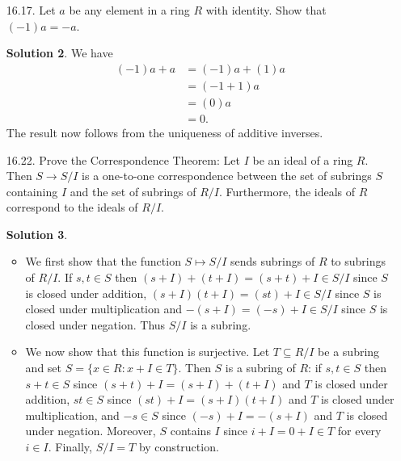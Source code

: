 \documentclass{article}
\theoremstyle{definition}
\newtheorem*{solution}{Solution}
\begin{document}
\begin{enumerate}
\begin{solution}
\begin{align*}
&= \begin{pmatrix} ac - bd & ad + bc \\ -ad - bc & ac - bd \end{pmatrix}
\end{align*}
Finally, we show that $\phi$ is injective and thus an isomorphism onto its image.  If $\phi(a + bi) = \begin{psmallmatrix} 0 & 0 \\ 0 & 0 \end{psmallmatrix}$ then $a = 0$ and $b = 0$.
\end{solution}
\item[16.17.] Let $a$ be any element in a ring $R$ with identity.  Show that $(-1)a = -a$.
\begin{solution}
We have
\begin{align*}
(-1)a + a &= (-1)a + (1)a \\
&= (-1 + 1)a \\
&= (0)a \\
&= 0.
\end{align*}
The result now follows from the uniqueness of additive inverses.
\end{solution}
\item[16.22.] Prove the Correspondence Theorem: Let $I$ be an ideal of a ring $R$. Then $S \to S/I$ is a one-to-one correspondence between the set of subrings $S$ containing $I$ and the set of subrings of $R/I$. Furthermore, the ideals of $R$ correspond to the ideals of $R/I$.
\begin{solution} $ $
\begin{itemize}
\item We first show that the function $S \mapsto S/I$ sends subrings of $R$ to subrings of $R/I$.  If $s, t \in S$ then $(s + I) + (t + I) = (s + t) + I \in S/I$ since $S$ is closed under addition, $(s + I)(t + I) = (st) + I \in S/I$ since $S$ is closed under multiplication and $-(s + I) = (-s) + I \in S/I$ since $S$ is closed under negation.  Thus $S/I$ is a subring.
\item We now show that this function is surjective.  Let $T \subseteq R/I$ be a subring and set $S = \{x \in R : x + I \in T\}$.  Then $S$ is a subring of $R$: if $s, t \in S$ then $s+t \in S$ since $(s + t) + I = (s + I) + (t + I)$ and $T$ is closed under addition, $st \in S$ since $(st) + I = (s + I)(t + I)$ and $T$ is closed under multiplication, and $-s \in S$ since $(-s) + I = -(s + I)$ and $T$ is closed under negation.  Moreover, $S$ contains $I$ since $i + I = 0 + I \in T$ for every $i \in I$.  Finally, $S/I = T$ by construction.

\end{itemize}
\end{solution}
\end{enumerate}
\end{document}
